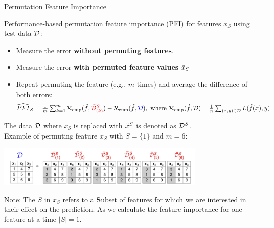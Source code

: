 \documentclass[11pt,compress,t,notes=noshow, aspectratio=169, xcolor=table]{beamer}
\begin{document}
\begin{vbframe}{Permutation Feature Importance}
\normalsize

Performance-based permutation feature importance (PFI) for features $x_S$ using test data $\D$:
\begin{itemize}
  \item Measure the error \color{blue}\textbf{without permuting features}\color{black}.
  \item Measure the error \color{red}\textbf{with permuted feature values} \color{black} $\pert{x}{}{}_S$
  \item Repeat permuting the feature (e.g., $m$ times) and average the difference of both errors: 
$$\widehat{PFI}_S = \tfrac{1}{m} \textstyle\sum\nolimits_{k = 1}^{m} \riske (\fh, {\color{red}\pert{\D}{S}{}_{(k)}}) - \riske (\fh, {\color{blue}\D}), \text{ where }
\riske(\fh, \D) = \frac{1}{n} \sum\nolimits_{(x, y) \in \D}  L(\fh(x), y)$$
\end{itemize}

The data $\D$ where $x_S$ is replaced with $\pert{x}{S}{}$ is denoted as $\pert{\D}{S}{}$.\\
Example of permuting feature $x_S$ with $S = \{1\}$ and $m=6$:

\begin{center}
\includegraphics[width=0.75\textwidth]{figure_man/permuted-fv.pdf}
\end{center}

\vspace*{0.2cm}
{\scriptsize{Note: 
The $S$ in $x_S$ refers to a \textbf{S}ubset of features for which we are interested in their effect on the prediction.
As we calculate the feature importance for one feature at a time $|S| = 1$.}\par}

\end{vbframe}



  
\end{document}
